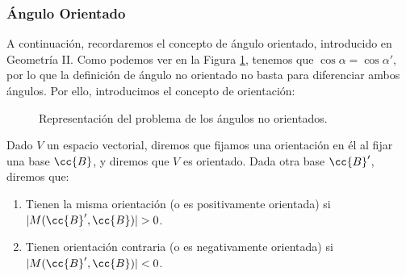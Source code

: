 \subsubsection{Ángulo Orientado}
A continuación, recordaremos el concepto de ángulo orientado, introducido en Geometría II. Como podemos ver en la Figura \ref{fig:ProblemaOrientacion}, tenemos que $\cos\alpha = \cos\alpha'$, por lo que la definición de ángulo no orientado no basta para diferenciar ambos ángulos. Por ello, introducimos el concepto de orientación:
\begin{figure}[H]
    \centering
    \caption{Representación del problema de los ángulos no orientados.}
    \label{fig:ProblemaOrientacion}
\end{figure}

\begin{definicion}
    Dado $V$ un espacio vectorial, diremos que fijamos una orientación en él al fijar una base $\cc{B}$, y diremos que $V$ es orientado. Dada otra base $\cc{B}'$, diremos que:
    \begin{enumerate}
        \item Tienen la misma orientación (o es positivamente orientada) si $|M(\cc{B}',\cc{B})|>0$.
        \item Tienen orientación contraria (o es negativamente orientada) si $|M(\cc{B}',\cc{B})|<0$.
    \end{enumerate}
\end{definicion}

